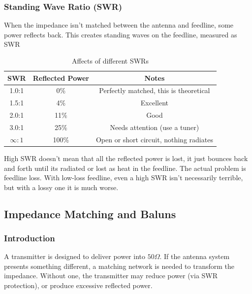 \documentclass{article}
\begin{document}
\subsubsection{Standing Wave Ratio (SWR)}
When the impedance isn't matched between the antenna and feedline, some power reflects back. This creates standing waves on the feedline, measured as SWR
\begin{table}[h]
    \centering
    \caption{Affects of different SWRs}
    \label{tab:8}
    \begin{tabular}{c|c|c}
        SWR & Reflected Power & Notes \\
        \hline
        \hline
        1.0:1 & 0\% & Perfectly matched, this is theoretical \\
        1.5:1 & 4\% & Excellent \\
        2.0:1 & 11\% & Good \\
        3.0:1 & 25\% & Needs attention (use a tuner) \\
        $\infty:1$ & 100\% & Open or short circuit, nothing radiates
    \end{tabular}
\end{table}
High SWR doesn't mean that all the reflected power is lost, it just bounces back and forth until its radiated or lost as heat in the feedline. The actual problem is feedline loss. With low-loss feedline, even a high SWR isn't necessarily terrible, but with a lossy one it is much worse.

\subsection{Impedance Matching and Baluns}
\subsubsection{Introduction}
A transmitter is designed to deliver power into $50\Omega $. If the antenna system presents something different, a matching network is needed to transform the impedance. Without one, the transmitter may reduce power (via SWR protection), or produce excessive reflected power.
\end{document}
